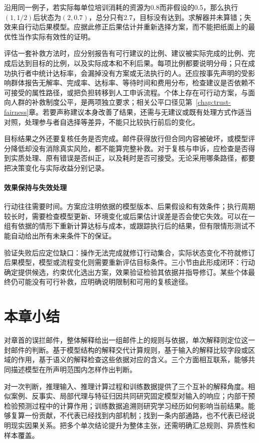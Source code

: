沿用同一例子，若实际每单位培训消耗的资源为0.8而非假设的0.5，那么执行$(1,1/2)$后状态为$(2,0.7)$，总分只有2.7，目标没有达到。求解器并未算错；失效来自行动后果模型。应据此修正后果估计并重新选择方案，而不能把纸面上的最优性当作实际有效性的证明。

评估一套补救方法时，应分别报告有可行建议的比例、建议被实际完成的比例、完成后达到目标的比例，以及实际成本和不利后果。每项比例都要说明分母；只在成功执行者中统计达标率，会漏掉没有方案或无法执行的人。还应按事先声明的受影响群体报告无解率、完成率、达标率、等待时间和费用分布，检查建议是否依赖不可接受的属性路径，或把负担转移到人工申诉流程。个体上存在可行动方案，与面向人群的补救制度公平，是两项独立要求；相关公平口径见第~\ref{chap:trust-fairness}章。若要声称建议本身改善了结果，还需与无建议或既有处理方式作适当对照，处理参与者自选择等差异，不能只比较执行前后的变化。

目标结果之外还要复核任务是否完成。邮件获得放行但合同内容被破坏，或模型评分降低却没有消除真实风险，都不能算完整补救。对于复核与申诉，应检查是否得到实质处理、原有错误是否纠正，以及耗时是否可接受。无论采用哪条路径，都要把决策变化与实际收益分别记录。

\paragraph{效果保持与失效处理}

行动往往需要时间。方案应注明依据的模型版本、后果假设和有效条件；执行周期较长时，需要检查模型更新、环境变化或后果估计误差是否会使它失效。可以在一组有依据的情形下重新计算达标与成本，或跟踪执行后的结果，但有限情形测试不能自动给出所有未来条件下的保证。

验证失败后应定位缺口：操作无法完成就修订行动集合，实际状态变化不符就修订后果模型，模型或流程变化则需要重新评估目标条件。三小节由此形成闭环：行动确定提供候选，约束优化选出方案，效果验证检验其依据并指导修订。某些个体最终仍可能没有可行补救，应明确说明限制和可用的复核途径。

\section{本章小结}
\label{sec:interpretability-summary}

对章首的误拦邮件，整体解释给出一组邮件上的规则与依据，单次解释则定位这一封邮件的判断。基于模型结构的解释交代计算规则，基于输入的解释比较字段或区域的作用，基于语义的解释检查这些依据对应的含义。三个方面相互联系，能够共同描述模型在所声明范围内怎样作出判断。

对一次判断，推理输入、推理计算过程和训练数据提供了三个互补的解释角度。相似案例、反事实、局部代理与特征归因共同研究固定模型对输入的响应；内部干预检验预测过程中的计算作用；训练数据追溯则研究学习经历如何影响当前结果。能够复算一份贡献，不代表已经找到内部机制；找到一条内部通路，也不代表已经说明现实因果关系。把多个单次结论提升为整体主张，还需明确汇总规则、异质性和样本覆盖。

